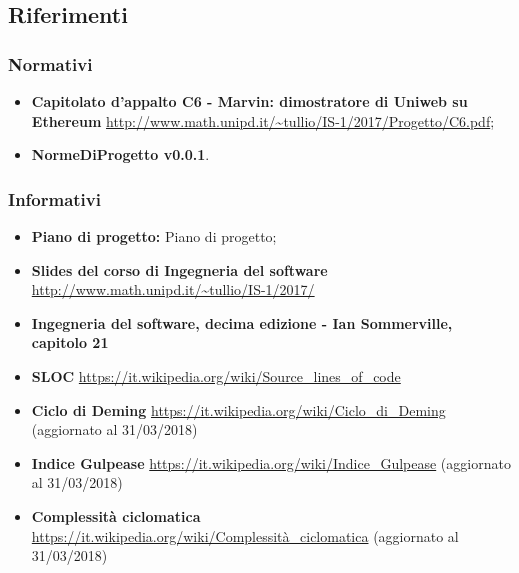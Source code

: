 \subsection{Riferimenti}
\subsubsection{Normativi}
\begin{itemize}
	\item
	\textbf{Capitolato d’appalto C6 - Marvin: dimostratore di Uniweb su Ethereum}
	\url{http://www.math.unipd.it/~tullio/IS-1/2017/Progetto/C6.pdf};
	\item
	\textbf{NormeDiProgetto v0.0.1}. 
	
	
\end{itemize}
\subsubsection{Informativi}
\begin{itemize}
	\item
	\textbf{Piano di progetto:} Piano di progetto;
	\item 
	\textbf{Slides del corso di Ingegneria del software} 
	\url{http://www.math.unipd.it/~tullio/IS-1/2017/}
	\item 
	\textbf{Ingegneria del software, decima edizione - Ian Sommerville, capitolo 21} 
	\item
	\textbf{SLOC}
	\url{https://it.wikipedia.org/wiki/Source_lines_of_code}
	\item
	\textbf{Ciclo di Deming}
	\url{https://it.wikipedia.org/wiki/Ciclo_di_Deming} (aggiornato al 31/03/2018)
	\item
	\textbf{Indice Gulpease}
	\url{https://it.wikipedia.org/wiki/Indice_Gulpease} (aggiornato al 31/03/2018)
	\item
	\textbf{Complessità ciclomatica}
	\url{https://it.wikipedia.org/wiki/Complessità_ciclomatica} (aggiornato al 31/03/2018)
	
\end{itemize}
